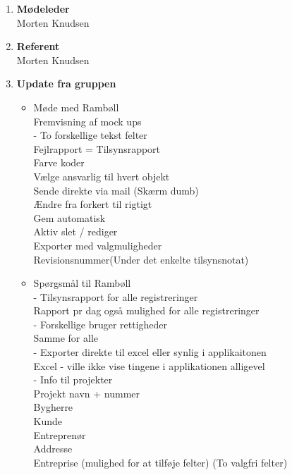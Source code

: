 	\begin{enumerate}
		\itemsep 0.3em 
		\item \textbf{Mødeleder}\\
			Morten Knudsen
		\item \textbf{Referent}\\
			Morten Knudsen

		\item \textbf{Update fra gruppen}
			\begin{itemize}[-]
			\item Møde med Rambøll\\
			Fremvisning af mock ups \\
			 - To forskellige tekst felter \\
			 Fejlrapport = Tilsynsrapport \\
			 Farve koder \\
			 Vælge ansvarlig til hvert objekt \\
			 Sende direkte via mail (Skærm dumb) \\
			 Ændre fra forkert til rigtigt \\
			 Gem automatisk \\
			 Aktiv slet / rediger \\
			 Exporter med valgmuligheder \\
			 Revisionsnummer(Under det enkelte tilsynsnotat) \\
			 
			\item Spørgsmål til Rambøll\\
			- Tilsynsrapport for alle registreringer \\
				Rapport pr dag også mulighed for alle registreringer \\
			- Forskellige bruger rettigheder \\
				Samme for alle \\
			- Exporter direkte til excel eller synlig i applikaitonen \\
				Excel - ville ikke vise tingene i applikationen alligevel \\
			- Info til projekter \\
				Projekt navn + nummer \\ 
				Bygherre \\
				Kunde \\
				Entreprenør \\
				Addresse \\
				Entreprise (mulighed for at tilføje felter) (To valgfri felter) \\
							

\end{itemize}
\end{enumerate}
